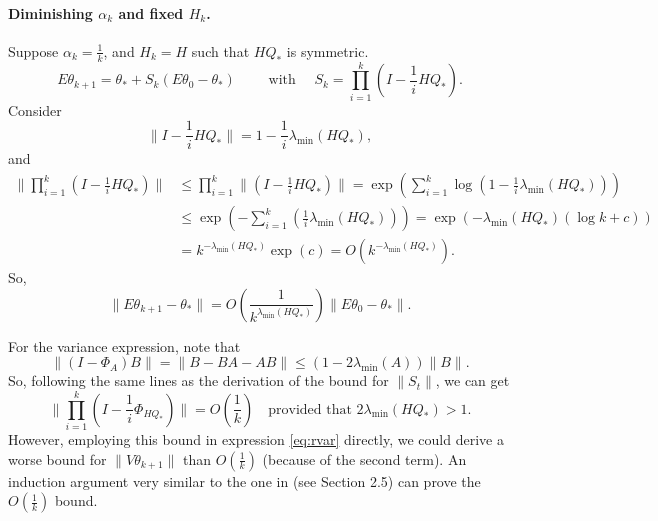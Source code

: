 \documentclass[12pt]{article}
\begin{document}
  \paragraph{Diminishing $\alpha_k$ and fixed $H_k$.}  Suppose $\alpha_k = \frac{1}{k}$, and $H_k = H$ such that $HQ_\ast$ is symmetric.
  \[
   E\theta_{k+1} = \theta_\ast + S_k (E\theta_0-\theta_\ast) \qquad\mbox{ with }\quad S_k = \prod_{i=1}^k(I-\frac{1}{i} H Q_\ast).
  \]
Consider
  \[
   \|I-\frac{1}{i} H Q_\ast\| = 1-\frac{1}{i}\lambda_{\min}(H Q_\ast),
  \]
and
  \begin{align*}
   \|\prod_{i=1}^k(I-\frac{1}{i} H Q_\ast)\| &\leq \prod_{i=1}^k\|(I-\frac{1}{i} H Q_\ast)\| = \exp\left(\sum_{i=1}^k\log(1-\frac{1}{i}\lambda_{\min}(H Q_\ast))\right)\\
   & \leq \exp\left(-\sum_{i=1}^k(\frac{1}{i}\lambda_{\min}(H Q_\ast))\right) = \exp\left(-\lambda_{\min}(H Q_\ast)(\log k+c)\right)\\
   & = k^{-\lambda_{\min}(HQ_\ast)}\exp(c) = O(k^{-\lambda_{\min}(HQ_\ast)}).
  \end{align*}
So,
  \[
    \boxed{\|E\theta_{k+1} - \theta_\ast\| = O\left(\frac{1}{k^{\lambda_{\min}(HQ_\ast)}}\right)\|E\theta_0-\theta_\ast\|.}
  \]

\bigskip

\noindent
For the variance expression, note that 
\[
 \|(I - \Phi_A)B\| =  \|B-BA-AB\| \leq (1-2\lambda_{\min}(A))\|B\|.
\]
So, following the same lines as the derivation of the bound for $\|S_t\|$, we can get
\[
 \|\prod_{i=1}^k(I-\frac{1}{i} \Phi_{H Q_\ast})\| = O(\frac{1}{k}) \quad \mbox{provided that } 2\lambda_{\min}(H Q_\ast)>1.
\]
However, employing this bound in expression \eqref{eq:rvar} directly, we could derive a worse bound for $\|V\theta_{k+1}\|$ than $O(\frac{1}{k})$ (because of the second term).  An induction argument very similar to the one in \cite{nemirovski:2009} (see Section 2.5) can prove the $O(\frac{1}{k})$ bound.
\end{document}
